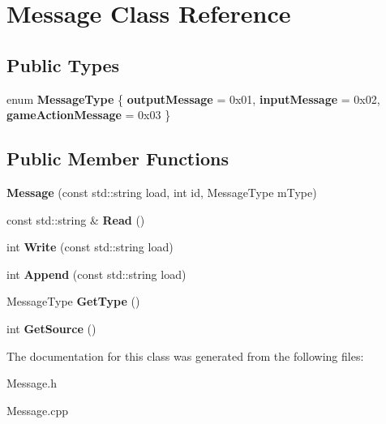 \hypertarget{class_message}{}\section{Message Class Reference}
\label{class_message}
\subsection*{Public Types}
\begin{DoxyCompactItemize}
\item 
\hypertarget{class_message_af4370c64206db0d5b0a3b7f8d3bbfc31}{}enum {\bfseries Message\+Type} \{ {\bfseries output\+Message} = 0x01, 
{\bfseries input\+Message} = 0x02, 
{\bfseries game\+Action\+Message} = 0x03
 \}\label{class_message_af4370c64206db0d5b0a3b7f8d3bbfc31}

\end{DoxyCompactItemize}
\subsection*{Public Member Functions}
\begin{DoxyCompactItemize}
\item 
\hypertarget{class_message_a3af4af638e94512f9a54eaf2638af46e}{}{\bfseries Message} (const std\+::string load, int id, Message\+Type m\+Type)\label{class_message_a3af4af638e94512f9a54eaf2638af46e}

\item 
\hypertarget{class_message_a739b4aaa722ec1491b61c938d40faf6a}{}const std\+::string \& {\bfseries Read} ()\label{class_message_a739b4aaa722ec1491b61c938d40faf6a}

\item 
\hypertarget{class_message_af4d9dc3589639d8e0612d2077823883a}{}int {\bfseries Write} (const std\+::string load)\label{class_message_af4d9dc3589639d8e0612d2077823883a}

\item 
\hypertarget{class_message_a62cbff053193fdb05ac7492623a206b3}{}int {\bfseries Append} (const std\+::string load)\label{class_message_a62cbff053193fdb05ac7492623a206b3}

\item 
\hypertarget{class_message_a5b6472c4ac06222f8a71e6622ff4d8f1}{}Message\+Type {\bfseries Get\+Type} ()\label{class_message_a5b6472c4ac06222f8a71e6622ff4d8f1}

\item 
\hypertarget{class_message_a1fb677cce4e09b890eb06403c8afd757}{}int {\bfseries Get\+Source} ()\label{class_message_a1fb677cce4e09b890eb06403c8afd757}

\end{DoxyCompactItemize}


The documentation for this class was generated from the following files\+:\begin{DoxyCompactItemize}
\item 
Message.\+h\item 
Message.\+cpp\end{DoxyCompactItemize}
